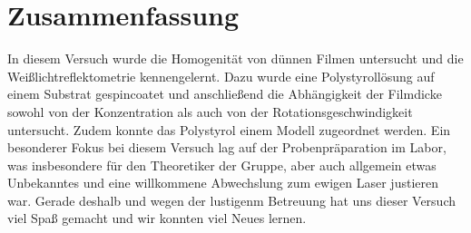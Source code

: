 \section{\label{sec:fazit}Zusammenfassung}
In diesem Versuch wurde die Homogenität von dünnen Filmen untersucht und die Weißlichtreflektometrie kennengelernt. Dazu wurde eine Polystyrollösung auf einem Substrat gespincoatet und anschließend die Abhängigkeit der Filmdicke sowohl von der Konzentration als auch von der Rotationsgeschwindigkeit untersucht. Zudem konnte das Polystyrol einem Modell zugeordnet werden. Ein besonderer Fokus bei diesem Versuch lag auf der Probenpräparation im Labor, was insbesondere für den Theoretiker der Gruppe, aber auch allgemein etwas Unbekanntes und eine willkommene Abwechslung zum ewigen Laser justieren war. Gerade deshalb und wegen der lustigenm Betreuung hat uns dieser Versuch viel Spaß gemacht und wir konnten viel Neues lernen. 